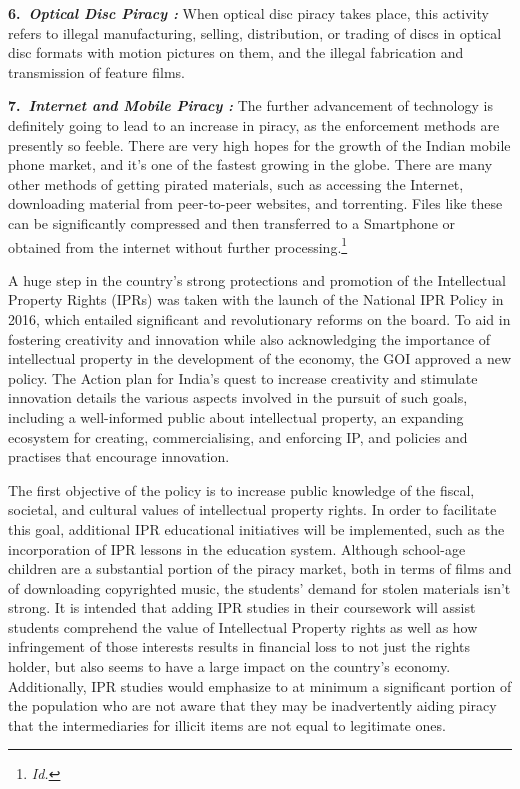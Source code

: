 \begin{multicols}{2}
\noi
{\large \bfseries 6.~\textit{Optical Disc Piracy :}} When optical disc piracy takes place, this activity refers to illegal
manufacturing, selling, distribution, or trading of discs in optical disc formats with motion
pictures on them, and the illegal fabrication and transmission of feature films.

\noi
{\large \bfseries 7.~\textit{Internet and Mobile Piracy :}} The further advancement of technology is definitely going to
lead to an increase in piracy, as the enforcement methods are presently so feeble. There are
very high hopes for the growth of the Indian mobile phone market, and it's one of the fastest
growing in the globe. There are many other methods of getting pirated materials, such as
accessing the Internet, downloading material from peer-to-peer websites, and torrenting. Files
like these can be significantly compressed and then transferred to a Smartphone or obtained
from the internet without further processing.\footnote{\textit{Id.}}


\noi
A huge step in the country’s strong protections and promotion of the Intellectual Property
Rights (IPRs) was taken with the launch of the National IPR Policy in 2016, which entailed
significant and revolutionary reforms on the board. To aid in fostering creativity and
innovation while also acknowledging the importance of intellectual property in the
development of the economy, the GOI approved a new policy. The Action plan for India's
quest to increase creativity and stimulate innovation details the various aspects involved in
the pursuit of such goals, including a well-informed public about intellectual property, an
expanding ecosystem for creating, commercialising, and enforcing IP, and policies and
practises that encourage innovation.

\vspace{-.1cm}

\noi
The first objective of the policy is to increase public knowledge of the fiscal, societal, and
cultural values of intellectual property rights. In order to facilitate this goal, additional IPR
educational initiatives will be implemented, such as the incorporation of IPR lessons in the
education system. Although school-age children are a substantial portion of the piracy
market, both in terms of films and of downloading copyrighted music, the students’ demand
for stolen materials isn't strong. It is intended that adding IPR studies in their coursework will
assist students comprehend the value of Intellectual Property rights as well as how
infringement of those interests results in financial loss to not just the rights holder, but also
seems to have a large impact on the country's economy. Additionally, IPR studies would
emphasize to at minimum a significant portion of the population who are not aware that they
may be inadvertently aiding piracy that the intermediaries for illicit items are not equal to
legitimate ones.


\end{multicols}
